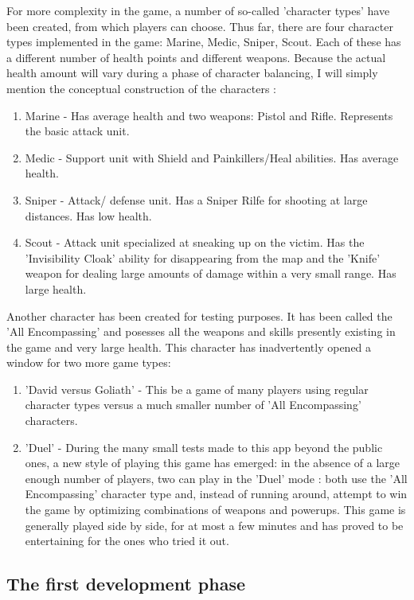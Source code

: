 \documentclass{article}
\begin{document}
For more complexity in the game, a number of so-called 'character types' have
been created, from which players can choose. Thus far, there are four character
types implemented in the game: Marine, Medic, Sniper, Scout. Each of these has a
different number of health points and different weapons. Because the actual
health amount will vary during a phase of character balancing, I will simply
mention the conceptual construction of the characters :
\begin{enumerate}
  \item Marine - Has average health and two weapons: Pistol and Rifle.
  Represents the basic attack unit.
  \item Medic - Support unit with Shield and Painkillers/Heal abilities. Has
  average health. 
  \item Sniper - Attack/ defense unit. Has a Sniper Rilfe for shooting at large
  distances. Has low health.
  \item Scout - Attack unit specialized at sneaking up on the victim. Has the
  'Invisibility Cloak' ability for disappearing from the map and the 'Knife'
  weapon for dealing large amounts of damage within a very small range. Has
  large health.
\end{enumerate}

Another character has been created for testing purposes. It has been called the
'All Encompassing' and posesses all the weapons and skills presently existing in
the game and very large health. This character has inadvertently opened a window
for two more game types: 
\begin{enumerate}
  \item 'David versus Goliath' - This be a game of many players using regular
  character types versus a much smaller number of 'All Encompassing' characters.
  \item 'Duel' - During the many small tests made to this app beyond the public
  ones, a new style of playing this game has emerged: in the absence of a large
  enough number of players, two can play in the 'Duel' mode : both use the 'All
  Encompassing' character type and, instead of running around, attempt to win
  the game by optimizing combinations of weapons and powerups. This game is
  generally played side by side, for at most a few minutes and has proved to be
  entertaining for the ones who tried it out.
\end{enumerate}



\subsection{The first development phase}
\end{document}
